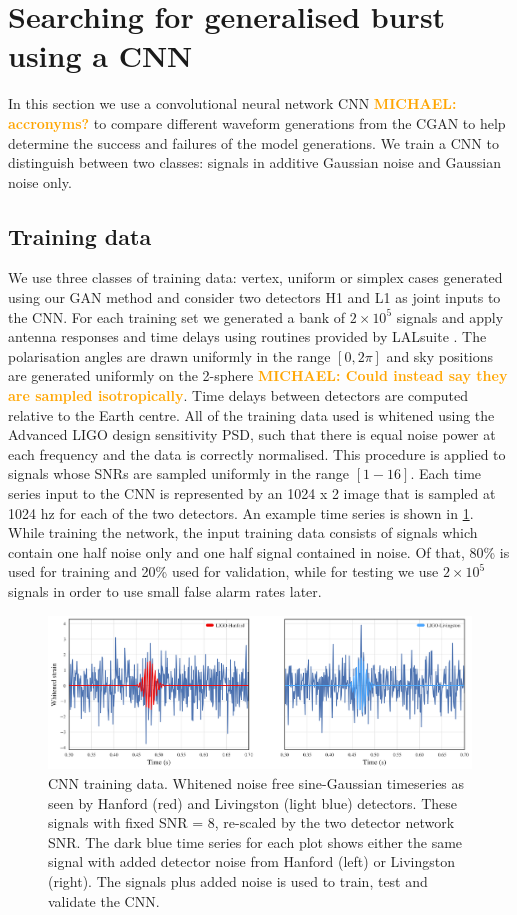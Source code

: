 \documentclass[12pt]{iopart}
\newcommand{\michael}[1]{\textbf{\textcolor{orange}{MICHAEL: #1}}}
\begin{document}
\section{Searching for generalised burst using a CNN}
In this section  we use a convolutional neural network \ac{CNN} \michael{accronyms?}
to compare different waveform generations from the \ac{CGAN} to help determine the
success and failures of the model generations. We train a \ac{CNN} to distinguish between two classes: signals in additive Gaussian
noise and Gaussian noise only. 
\subsection{Training data} 
We use three classes of training data: vertex, uniform or simplex cases generated using our \ac{GAN} method and consider two detectors H1 and L1 as joint inputs to the \ac{CNN}. For each training set we generated a bank of $2\times 10^5$ signals and apply antenna responses and time delays using routines provided by LALsuite \cite{lalsuite}. The polarisation angles are drawn uniformly in the range $[0,2\pi]$ and sky positions are generated uniformly on the 2-sphere \michael{Could instead say they are sampled isotropically}. Time delays between detectors are computed relative to the Earth centre. All of the training data used is whitened using the Advanced LIGO
design sensitivity \ac{PSD}, such that there is equal noise power at each
frequency and the data is correctly normalised. This procedure is
applied to signals whose \acp{SNR} are sampled uniformly in the range $[1-16]$. Each time series input to the \ac{CNN} is represented by an 1024 x 2 image that is sampled at 1024 hz for each of the two detectors. An example time series is shown in \cref{fig:cnn_training}. While training the network, the input training data consists of
signals which contain one half noise only and one half signal contained in
noise. Of that, 80\% is used for training and 20\% used for validation, while for testing we use $2\times 10^5$ signals in order to use small false alarm rates later.

\begin{figure}[ht!]
    \centering
    \includegraphics[width=\textwidth]{figures/SNR8.png}
    \caption{\ac{CNN} training data. Whitened noise free sine-Gaussian timeseries as seen by Hanford (red) and Livingston (light blue) detectors. These signals with fixed SNR = 8, re-scaled by the two detector network SNR. The dark blue time series for each plot shows either the same signal with added detector noise from Hanford (left) or Livingston (right). The signals plus added noise is used to train, test and validate the \ac{CNN}.}
     \label{fig:cnn_training}
\end{figure}
\end{document}
